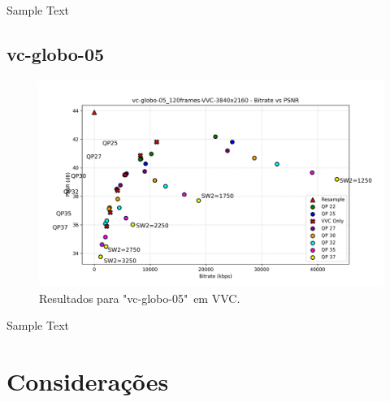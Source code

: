 Sample Text

\newpage

\subsection{vc-globo-05}

\begin{figure}[h]
    \centering
    \includegraphics[width=1.0\textwidth]{img/vc-globo-05_120frames-VVC.png}
    \caption{Resultados para "vc-globo-05"\ em \acrshort{VVC}.}
    \label{fig:vc-globo-05-VVC}
\end{figure}

Sample Text

\newpage

\section{Considerações}

